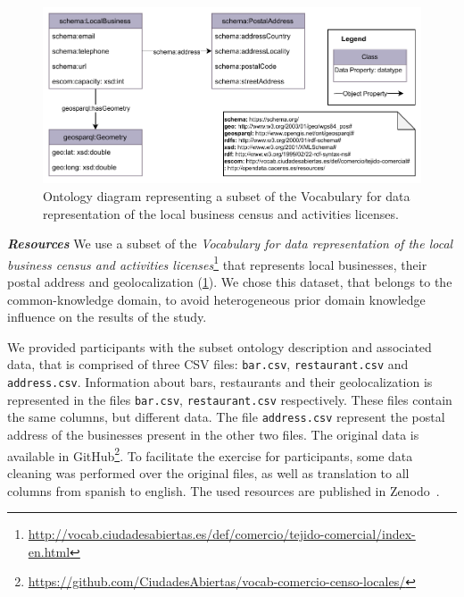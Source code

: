 \begin{figure}[!t]
\centering
\includegraphics[width=\linewidth]{figures/chp5-1_us_onto.pdf}
\caption[Ontology diagram for the user study exercise of Mapeathor]{Ontology diagram representing a subset of the Vocabulary for data representation of the local business census and activities licenses.}
\label{fig:chp5-1_us_onto}
\end{figure}

\noindent\textit{\textbf{Resources}}
We use a subset of the \textit{Vocabulary for data representation of the local business census and activities licenses}\footnote{\url{http://vocab.ciudadesabiertas.es/def/comercio/tejido-comercial/index-en.html}} that represents local businesses, their postal address and geolocalization (\cref{fig:chp5-1_us_onto}). 
We chose this dataset, that belongs to the common-knowledge domain, to avoid heterogeneous prior domain knowledge influence on the results of the study.

We provided participants with the subset ontology description and associated data, that is comprised of three CSV files: \texttt{bar.csv}, \texttt{restaurant.csv} and \texttt{address.csv}. Information about bars, restaurants and their geolocalization is represented in the files \texttt{bar.csv}, \texttt{restaurant.csv} respectively. 
These files contain the same columns, but different data. The file \texttt{address.csv} represent the postal address of the businesses present in the other two files. 
The original data is available in GitHub\footnote{\url{https://github.com/CiudadesAbiertas/vocab-comercio-censo-locales/}}. 
To facilitate the exercise for participants, some data cleaning was performed over the original files, as well as translation to all columns from spanish to english. The used resources are published in Zenodo~\parencite{iglesias-molina_2022_8154522}.



